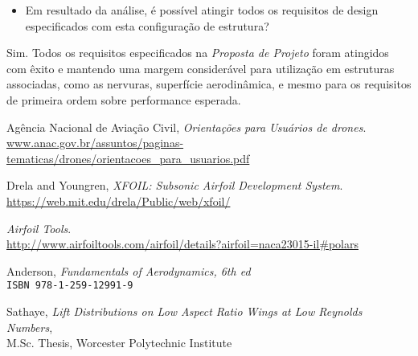 \documentclass[a4paper]{article}
\begin{document}
\begin{itemize}
    \item Em resultado da análise, é possível atingir todos os requisitos de design especificados com esta configuração de estrutura?
\end{itemize}

\noindent Sim. Todos os requisitos especificados na \textit{Proposta de Projeto} foram atingidos com êxito e mantendo uma margem considerável para utilização em estruturas associadas, como as nervuras, superfície aerodinâmica, e mesmo para os requisitos de primeira ordem sobre performance esperada.

\begin{thebibliography}{9}
    Agência Nacional de Aviação Civil,   
    \textit{Orientações para Usuários de drones}.
    \\\url{www.anac.gov.br/assuntos/paginas-tematicas/drones/orientacoes\_para\_usuarios.pdf}

    Drela and Youngren,   
    \textit{XFOIL: Subsonic Airfoil Development System}.
    \\\url{https://web.mit.edu/drela/Public/web/xfoil/}

    \textit{Airfoil Tools}.
    \\\url{http://www.airfoiltools.com/airfoil/details?airfoil=naca23015-il#polars}

    Anderson,
    \textit{Fundamentals of Aerodynamics, 6th ed}
    \\\texttt{ISBN 978-1-259-12991-9}

    Sathaye,
    \textit{Lift Distributions on Low Aspect Ratio Wings at Low Reynolds Numbers},
    \\M.Sc. Thesis, Worcester Polytechnic Institute

\end{thebibliography}
\end{document}
